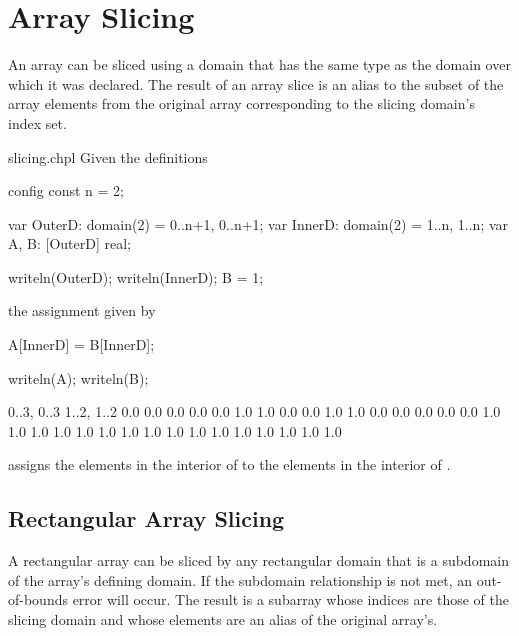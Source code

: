 \section{Array Slicing}
\label{Array_Slicing}

An array can be sliced using a domain that has the same type as the
domain over which it was declared.  The result of an array slice is an
alias to the subset of the array elements from the original array
corresponding to the slicing domain's index set.
 
\begin{chapelexample}{slicing.chpl}
Given the definitions
\begin{chapelpre}
config const n = 2;
\end{chapelpre}
\begin{chapel}
var OuterD: domain(2) = {0..n+1, 0..n+1};
var InnerD: domain(2) = {1..n, 1..n};
var A, B: [OuterD] real;
\end{chapel}
\begin{chapelnoprint}
writeln(OuterD);
writeln(InnerD);
B = 1;
\end{chapelnoprint}
the assignment given by
\begin{chapel}
A[InnerD] = B[InnerD];
\end{chapel}
\begin{chapelpost}
writeln(A);
writeln(B);
\end{chapelpost}
\begin{chapeloutput}
{0..3, 0..3}
{1..2, 1..2}
0.0 0.0 0.0 0.0
0.0 1.0 1.0 0.0
0.0 1.0 1.0 0.0
0.0 0.0 0.0 0.0
1.0 1.0 1.0 1.0
1.0 1.0 1.0 1.0
1.0 1.0 1.0 1.0
1.0 1.0 1.0 1.0
\end{chapeloutput}
assigns the elements in the interior of  to the elements in
the interior of .
\end{chapelexample}

\subsection{Rectangular Array Slicing}
\label{Rectangular_Array_Slicing}

A rectangular array can be sliced by any rectangular domain that is a
subdomain of the array's defining domain.  If the subdomain
relationship is not met, an out-of-bounds error will occur.  The
result is a subarray whose indices are those of the slicing domain and
whose elements are an alias of the original array's.

